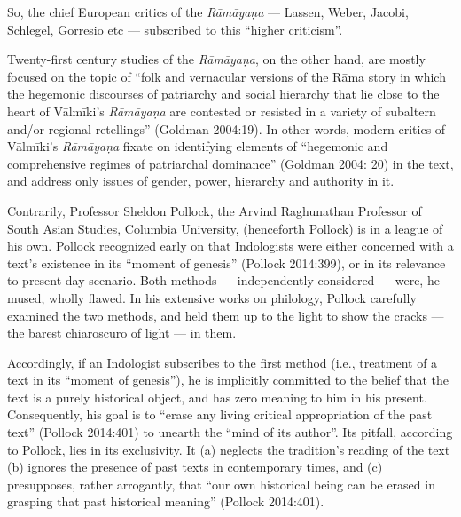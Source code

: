 So, the chief European critics of the {\sl Rāmāyaṇa} — Lassen, Weber, Jacobi, Schlegel, Gorresio etc --- subscribed to this “higher criticism”. 

Twenty-first century studies of the {\sl Rāmāyaṇa}, on the other hand, are mostly focused on the topic of “folk and vernacular versions of the Rāma story in which the hegemonic discourses of patriarchy and social hierarchy that lie close to the heart of Vālmīki’s {\sl Rāmāyaṇa} are contested or resisted in a variety of subaltern and/or regional retellings” (Goldman 2004:19). In other words, modern critics of Vālmīki’s {\sl Rāmāyaṇa} fixate on identifying elements of “hegemonic and comprehensive regimes of patriarchal dominance” (Goldman 2004: 20) in the text, and address only issues of gender, power, hierarchy and authority in it.  

Contrarily, Professor Sheldon Pollock, the Arvind Raghunathan Professor of South Asian Studies, Columbia University, (henceforth Pollock) is in a league of his own. Pollock recognized early on that Indologists were either concerned with a text’s existence in its “moment of genesis” (Pollock 2014:399), or in its relevance to present-day scenario. Both methods --- independently considered --- were, he mused, wholly flawed. In his extensive works on philology, Pollock carefully examined the two methods, and held them up to the light to show the cracks --- the barest chiaroscuro of light --- in them.

Accordingly, if an Indologist subscribes to the first method (i.e., treatment of a text in its “moment of genesis”), he is implicitly committed to the belief that the text is a purely historical object, and has zero meaning to him in his present. Consequently, his goal is to “erase any living critical appropriation of the past text” (Pollock 2014:401) to unearth the “mind of its author”. Its pitfall, according to Pollock, lies in its exclusivity. It (a) neglects the tradition’s reading of the text (b) ignores the presence of past texts in contemporary times, and (c) presupposes, rather arrogantly, that “our own historical being can be erased in grasping that past historical meaning” (Pollock 2014:401). 

